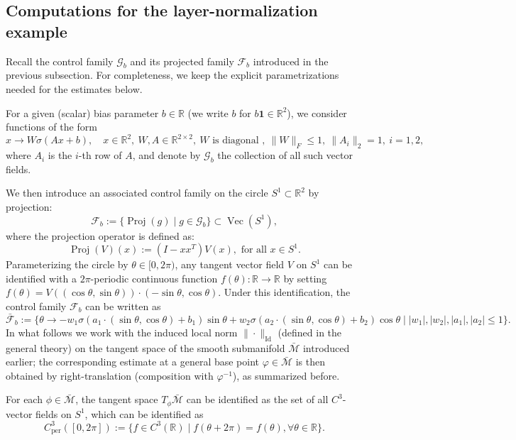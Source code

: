 \documentclass[12pt]{amsart}
\numberwithin{equation}{section}
\theoremstyle{remark}
\begin{document}
\subsection*{Computations for the layer-normalization example}

Recall the control family $\mathcal G_b$ and its projected family $\mathcal F_b$ introduced in the previous subsection.
For completeness, we keep the explicit parametrizations needed for the estimates below.

For a given (scalar) bias parameter $b\in \mathbb R$ (we write $b$ for $b\mathbf 1\in\mathbb R^2$), we consider functions of the form
\begin{equation}
    x\to W\sigma(Ax+b), \quad x\in \mathbb R^2, \ W, A\in \mathbb R^{2\times 2}, \ W \text{ is diagonal }, \ \|W\|_F\le 1, \ \|A_i\|_2=1, \ i=1,2,
\end{equation}
where $A_i$ is the $i$-th row of $A$, and denote by $\mathcal G_b$ the collection of all such vector fields.

We then introduce an associated control family on the circle $S^1\subset \mathbb R^2$ by projection:
\begin{equation}
    \mathcal F_b:=\{\operatorname{Proj}(g)\mid g\in \mathcal G_b\} \subset \operatorname{Vec}(S^1),
\end{equation}
where the projection operator is defined as:
$$
\operatorname{Proj}(V)(x):=(I-xx^T)V(x), \text{ for all } x\in S^1.
$$
Parameterizing the circle by $\theta\in [0,2\pi)$, any tangent vector field $V$ on $S^1$ can be identified with a $2\pi$-periodic continuous function $f(\theta): \mathbb R\to \mathbb R $ by setting
$f(\theta)= V((\cos\theta, \sin \theta))\cdot (-\sin \theta, \cos \theta)$.
Under this identification, the control family $\mathcal F_b$ can be written as
\begin{equation}
    \bar{\mathcal F}_b:=\{\theta \to - w_1\sigma(a_1\cdot (\sin\theta, \cos \theta) +b_1)\sin\theta+w_2\sigma(a_2\cdot (\sin \theta, \cos \theta)+ b_2)\cos\theta\mid |w_1|, |w_2|, |a_1|, |a_2|\le 1\}.
\end{equation}
In what follows we work with the induced local norm $\|\cdot\|_{\operatorname{Id}}$ (defined in the general theory) on the tangent space of the smooth submanifold $\bar{\mathcal M}$ introduced earlier; the corresponding estimate at a general base point $\varphi\in\bar{\mathcal M}$ is then obtained by right-translation (composition with $\varphi^{-1}$), as summarized before.

For each $\phi\in \bar{\mathcal M}$, the tangent space $T_\phi \bar{\mathcal M}$ can be identified as the set of all $C^3$-vector fields on $S^1$, which can be identified as
\begin{equation}
    C_{\text{per}}^3([0,2\pi]):=\{f\in C^3(\mathbb R)\mid f(\theta+2\pi)=f(\theta), \forall \theta\in \mathbb R\}.
\end{equation}
\end{document}
